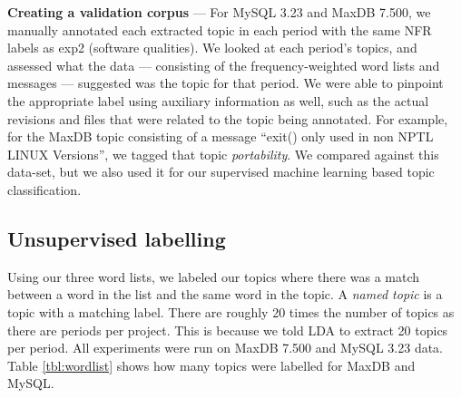 \documentclass[]{sig-alternate}
\begin{document}
\noindent \textbf{Creating a validation corpus} --- For MySQL 3.23 and MaxDB 7.500, we manually annotated each extracted topic in each period with the same NFR labels as \textsf{exp2} (software qualities). 
We looked at each period's topics, and assessed what the data --- consisting of the frequency-weighted word lists and messages --- suggested was the topic for that period. 
We were able to pinpoint the appropriate label using auxiliary information as well, such as the actual revisions and files that were related to the topic being annotated.
For example, for the MaxDB topic consisting of a message ``exit() only used in non NPTL LINUX Versions'', we tagged that topic \emph{portability}. 
We compared against this data-set, but we also used it for our supervised machine learning based topic classification. 


\subsection{Unsupervised labelling}
\label{sec:unsuplabelling}

Using our three word lists, we labeled our topics where there was a match between a word in the list and the same word in the topic.
A \emph{named topic} is a topic with a matching label. 
There are roughly 20 times the number of topics as there are periods per project. 
This is because we told LDA to extract 20 topics per period. 
All experiments were run on MaxDB 7.500 and MySQL 3.23 data.
Table \ref{tbl:wordlist} shows how many topics were labelled for MaxDB
and MySQL.
\end{document}
